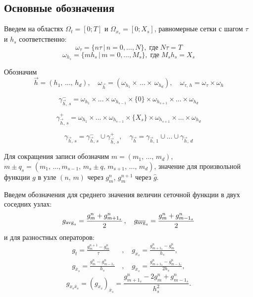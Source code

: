 \subsection{Основные обозначения}\label{sec:notation}
Введем на областях $\Omega_t = [0; T]$ и $\Omega_{x_s} = [0; X_s]$, 
равномерные сетки с шагом $\tau$ и $h_s$ соответственно:
$$ \omega_{\tau} = \{n \tau \,|\, n = 0,\dots,N\},   \;\text{где}\; N \tau = T  $$
$$ \omega_{h_s}  = \{m h_s  \,|\, m = 0,\dots,M_s\}, \;\text{где}\; M_s h_s = X_s $$

Обозначим 
$$ 
   \vec{h} = (h_1, \, \ldots, \, h_d), \quad
   \omega_{\vec{h}} = (\omega_{h_1} \times \, \ldots \times \, \omega_{h_d}), \quad
   \omega_{\tau, \, h} = \omega_{\tau} \times \omega_h
$$

$$ \gamma_{\vec{h}, \, s}^- = \omega_{h_1}     \times \ldots \times \omega_{h_{s-1}} 
        \times \{ 0 \} \times \omega_{h_{s+1}} \times \ldots \times \omega_{h_d}     $$

$$ \gamma_{\vec{h}, \, s}^+ = \omega_{h_1}     \times \ldots \times \omega_{h_{s-1}}
      \times \{ X_s \} \times \omega_{h_{s+1}} \times \ldots \times \omega_{h_d}    $$

$$ \gamma_{\vec{h}, \, s} = \gamma_{\vec{h}, \, s}^- \cup \gamma_{\vec{h}, \, s}^+, \quad
   \gamma_{\vec{h}} = \gamma_{\vec{h}, \, 1} \cup \ldots \cup \gamma_{\vec{h}, \, d}  $$ 


Для сокращения записи обозначим 
$m = (m_1, \, \ldots, \, m_d)$, $m \pm q_s = (m_1, \, \ldots, m_{s-1}, \, m_s \pm q, \, m_{s+1}, \, \ldots, \, m_d)$,
значение для произвольной функции $g$ в узле $(n, \, m)$ через $g^n_m$, $g^{n+1}_m$ через $\widehat{g}$. 

Введем обозначения для среднего значения величин сеточной функции в двух соседних узлах:
\begin{align*}
  g_{\operatorname{avg}_s}      = \frac{g^n_m + g^n_{m + 1_s}}{2}    \,,\quad
  g_{\overline{\operatorname{avg}}_s} = \frac{g^n_m + g^n_{m - 1_s}}{2}            
\end{align*}
и для разностных операторов:
\begin{align*}
    g_t = \frac{g^{n+1}_m - g^n_m}{\tau}&  \,,\quad
    g_{x_s} = \frac{g^n_{m + 1_s} - g^n_m}{h_s}, \\
    g_{\overline{x}_s} = \frac{g^n_m - g^n_{m - 1_s}}{h_s}&  \,,\quad 
    g_{\mathring{x}_s} = \frac{g^n_{m + 1_s} - g^n_{m - 1_s}}{2 h_s},
\end{align*}
\begin{equation*}
    g_{x_s \overline{x}_s} = (g_{x_s})_{\overline{x}_s} = \frac{g^n_{m + 1_s} - 2 g^n_m + g^n_{m - 1_s}}{h_s^2}.
\end{equation*}